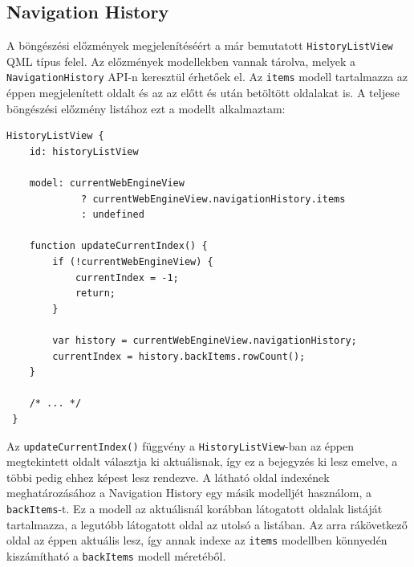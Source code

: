 \documentclass[12pt]{report}
\begin{document}
\subsection{Navigation History}
A böngészési előzmények megjelenítéséért a már bemutatott \texttt{HistoryListView}
QML típus felel. Az előzmények modellekben vannak tárolva, melyek a \\
\texttt{NavigationHistory} API-n keresztül érhetőek el. Az \texttt{items} modell tartalmazza
az éppen megjelenített oldalt és az az előtt és után betöltött oldalakat is.
A teljese böngészési előzmény listához ezt a modellt alkalmaztam:
\begin{lstlisting}[title=main.qml]
 HistoryListView {
    id: historyListView

    model: currentWebEngineView
             ? currentWebEngineView.navigationHistory.items
             : undefined

    function updateCurrentIndex() {
        if (!currentWebEngineView) {
            currentIndex = -1;
            return;
        }

        var history = currentWebEngineView.navigationHistory;
        currentIndex = history.backItems.rowCount();
    }

    /* ... */
 }
\end{lstlisting}
Az \texttt{updateCurrentIndex()} függvény a \texttt{HistoryListView}-ban az éppen megtekintett
oldalt választja ki aktuálisnak, így ez a bejegyzés ki lesz emelve, a többi pedig ehhez
képest lesz rendezve. A látható oldal indexének meghatározásához a Navigation History egy
másik modelljét használom, a \texttt{backItems}-t. Ez a modell az aktuálisnál korábban
látogatott oldalak listáját tartalmazza, a legutóbb látogatott oldal az utolsó a listában.
Az arra rákövetkező oldal az éppen aktuális lesz, így annak indexe az \texttt{items} modellben
könnyedén kiszámítható a \texttt{backItems} modell méretéből.
\end{document}
